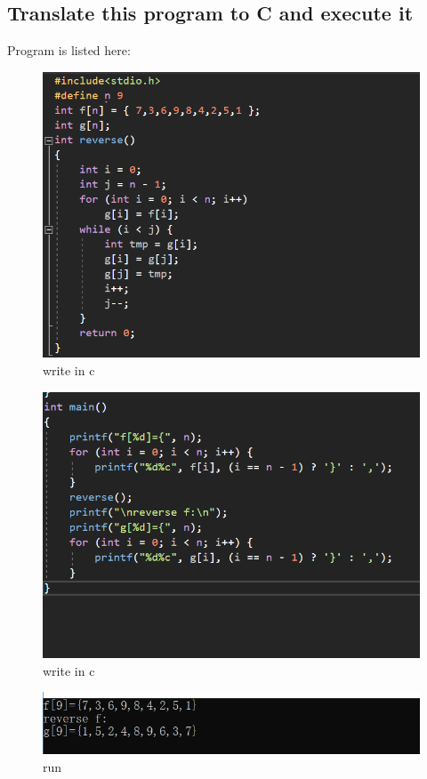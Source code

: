 \documentclass[11pt,a4paper,fleqn]{article}
\begin{document}
\subsection{Translate this program to C and execute it}
\noindent
Program is listed here:
\begin{figure}[h!]
\centering
\includegraphics{1.png}
\caption{ write in c}
\label{fig}
\end{figure}
\begin{figure}[h!]
\centering
\includegraphics{2.png}
\caption{ write in c}
\label{fig}
\end{figure}
\begin{figure}[h!]
\centering
\includegraphics{3.png}
\caption{ run }
\label{fig}
\end{figure}
\end{document}
